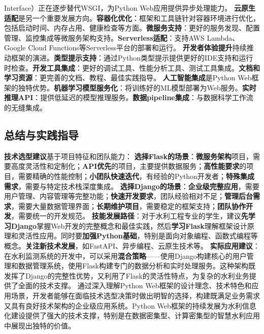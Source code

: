 Interface）正在逐步替代WSGI，为Python Web应用提供异步处理能力。 \textbf{云原生适配}是另一个重要发展方向。\textbf{容器化优化}：框架和工具链针对容器环境进行优化，包括启动时间、内存占用、健康检查等方面。\textbf{微服务支持}：更好的服务发现、配置管理、监控集成等微服务架构支持。\textbf{Serverless适配}：支持AWS Lambda、Google Cloud Functions等Serverless平台的部署和运行。 \textbf{开发者体验提升}持续推动框架的演进。\textbf{类型提示支持}：通过Python类型提示提供更好的IDE支持和运行时检查。\textbf{开发工具集成}：更好的调试工具、性能分析工具、测试工具集成。\textbf{文档和学习资源}：更完善的文档、教程、最佳实践指导。 \textbf{人工智能集成}是Python Web框架的独特优势。\textbf{机器学习模型服务化}：将训练好的ML模型部署为Web服务。\textbf{实时推理API}：提供低延迟的模型推理服务。\textbf{数据pipeline集成}：与数据科学工作流的无缝集成。 \subsection{总结与实践指导}\label{ux603bux7ed3ux4e0eux5b9eux8df5ux6307ux5bfc} \textbf{技术选型建议}基于项目特征和团队能力： \textbf{选择Flask的场景}：\textbf{微服务架构}项目，需要高度灵活性和定制化；\textbf{API优先}的项目，主要提供数据服务；\textbf{高性能要求}的项目，需要精确的性能控制；\textbf{小团队快速迭代}，有经验的Python开发者；\textbf{特殊集成需求}，需要与特定技术栈深度集成。 \textbf{选择Django的场景}：\textbf{企业级完整应用}，需要用户管理、内容管理等完整功能；\textbf{快速开发要求}，团队经验相对不足；\textbf{管理后台需求}，需要大量数据管理界面；\textbf{长期维护项目}，需要稳定的框架支持；\textbf{团队协作开发}，需要统一的开发规范。 \textbf{技能发展路径}：对于水利工程专业的学生，建议\textbf{先学习Django}掌握Web开发的完整概念和最佳实践，然后\textbf{学习Flask}理解框架设计原理和灵活性应用。同时要\textbf{加强Python基础}，特别是面向对象编程、函数式编程等概念。\textbf{关注新技术发展}，如FastAPI、异步编程、云原生技术等。 \textbf{实际应用建议}：在水利监测系统的开发中，可以采用\textbf{混合策略}------使用Django构建核心的用户管理和数据管理系统，使用Flask构建专门的数据分析和实时处理服务。这种架构既发挥了Django的完整性优势，又利用了Flask的灵活性特点，为复杂的水利业务提供了全面的技术支撑。 通过深入理解Python Web框架的设计理念、技术特色和应用场景，开发者能够在面临技术选型决策时做出明智的选择，构建既满足业务需求又具有良好技术架构的企业级应用系统。Python Web框架的持续发展为水利信息化建设提供了强大的技术支撑，特别是在数据密集型、计算密集型的智慧水利应用中展现出独特的价值。
